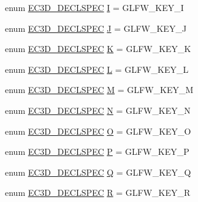 \begin{DoxyCompactItemize}
\item 
enum \mbox{\hyperlink{_common_8h_aac42573e202ca3dd4d259c81691e2369}{E\+C3\+D\+\_\+\+D\+E\+C\+L\+S\+P\+EC}} \mbox{\hyperlink{classec_1_1_keyboard_a38ffec286d89e2499ffd76a41eba6897}{I}} = G\+L\+F\+W\+\_\+\+K\+E\+Y\+\_\+I
\item 
enum \mbox{\hyperlink{_common_8h_aac42573e202ca3dd4d259c81691e2369}{E\+C3\+D\+\_\+\+D\+E\+C\+L\+S\+P\+EC}} \mbox{\hyperlink{classec_1_1_keyboard_a35fe05168d3f2cca6dae07278faa8b75}{J}} = G\+L\+F\+W\+\_\+\+K\+E\+Y\+\_\+J
\item 
enum \mbox{\hyperlink{_common_8h_aac42573e202ca3dd4d259c81691e2369}{E\+C3\+D\+\_\+\+D\+E\+C\+L\+S\+P\+EC}} \mbox{\hyperlink{classec_1_1_keyboard_a43e568b3ad27c96695d50386628353ba}{K}} = G\+L\+F\+W\+\_\+\+K\+E\+Y\+\_\+K
\item 
enum \mbox{\hyperlink{_common_8h_aac42573e202ca3dd4d259c81691e2369}{E\+C3\+D\+\_\+\+D\+E\+C\+L\+S\+P\+EC}} \mbox{\hyperlink{classec_1_1_keyboard_ae3ec80e2b98d6ef1d6fb921ddf3cb52e}{L}} = G\+L\+F\+W\+\_\+\+K\+E\+Y\+\_\+L
\item 
enum \mbox{\hyperlink{_common_8h_aac42573e202ca3dd4d259c81691e2369}{E\+C3\+D\+\_\+\+D\+E\+C\+L\+S\+P\+EC}} \mbox{\hyperlink{classec_1_1_keyboard_ae9723063b666c0dd21e96588ebb734c9}{M}} = G\+L\+F\+W\+\_\+\+K\+E\+Y\+\_\+M
\item 
enum \mbox{\hyperlink{_common_8h_aac42573e202ca3dd4d259c81691e2369}{E\+C3\+D\+\_\+\+D\+E\+C\+L\+S\+P\+EC}} \mbox{\hyperlink{classec_1_1_keyboard_a4dcb87a802eb8775401ae36ac5bd4358}{N}} = G\+L\+F\+W\+\_\+\+K\+E\+Y\+\_\+N
\item 
enum \mbox{\hyperlink{_common_8h_aac42573e202ca3dd4d259c81691e2369}{E\+C3\+D\+\_\+\+D\+E\+C\+L\+S\+P\+EC}} \mbox{\hyperlink{classec_1_1_keyboard_acc3419f140a0bb0e253c84315d7277c7}{O}} = G\+L\+F\+W\+\_\+\+K\+E\+Y\+\_\+O
\item 
enum \mbox{\hyperlink{_common_8h_aac42573e202ca3dd4d259c81691e2369}{E\+C3\+D\+\_\+\+D\+E\+C\+L\+S\+P\+EC}} \mbox{\hyperlink{classec_1_1_keyboard_ab3ab1aa54525f4e0488a0b57a68b8757}{P}} = G\+L\+F\+W\+\_\+\+K\+E\+Y\+\_\+P
\item 
enum \mbox{\hyperlink{_common_8h_aac42573e202ca3dd4d259c81691e2369}{E\+C3\+D\+\_\+\+D\+E\+C\+L\+S\+P\+EC}} \mbox{\hyperlink{classec_1_1_keyboard_a7d2ade0eca9959dcd82b4c4ae9c3a27b}{Q}} = G\+L\+F\+W\+\_\+\+K\+E\+Y\+\_\+Q
\item 
enum \mbox{\hyperlink{_common_8h_aac42573e202ca3dd4d259c81691e2369}{E\+C3\+D\+\_\+\+D\+E\+C\+L\+S\+P\+EC}} \mbox{\hyperlink{classec_1_1_keyboard_a3f2649d7249962a4f485557e405d4754}{R}} = G\+L\+F\+W\+\_\+\+K\+E\+Y\+\_\+R

\end{DoxyCompactItemize}
